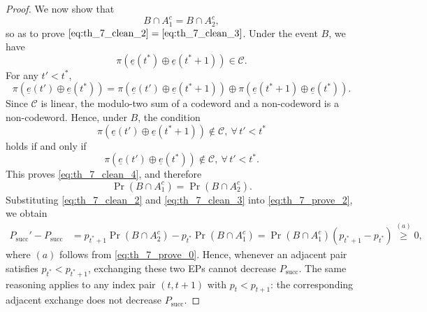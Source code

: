 \documentclass[letterpaper,draftclsnofoot,onecolumn]{IEEEtran}
\begin{document}
\begin{proof}
We now show that
\begin{equation}\label{eq:th_7_clean_4}
    B\cap A_1^c = B\cap A_2^c,
\end{equation}
so as to prove $\eqref{eq:th_7_clean_2} = \eqref{eq:th_7_clean_3}$. Under the event $B$, we have
\begin{equation}
\pi(\underline{e}(t^{*})\oplus \underline{e}(t^{*}+1))\in\mathcal{C}.
\end{equation}
For any $t'<t^{*}$,
\begin{equation}
\pi(\underline{e}(t')\oplus \underline{e}(t^{*}))
= \pi(\underline{e}(t')\oplus \underline{e}(t^{*}+1)) \oplus \pi(\underline{e}(t^{*}+1)\oplus \underline{e}(t^{*})).
\end{equation}
Since $\mathcal{C}$ is linear, the modulo-two sum of a codeword and a non-codeword is a non-codeword. Hence, under $B$, the condition
\begin{equation}
\pi(\underline{e}(t')\oplus \underline{e}(t^{*}+1))\notin\mathcal{C},\ \forall\, t'<t^{*}
\end{equation}
holds if and only if
\begin{equation}
\pi(\underline{e}(t')\oplus \underline{e}(t^{*}))\notin\mathcal{C},\ \forall\, t'<t^{*}.
\end{equation}
This proves \eqref{eq:th_7_clean_4}, and therefore
\begin{equation}
    \Pr(B\cap A_1^c)=\Pr(B\cap A_2^c).
\end{equation}
Substituting \eqref{eq:th_7_clean_2} and \eqref{eq:th_7_clean_3} into \eqref{eq:th_7_prove_2}, we obtain
\begin{align}
    P_{\mathrm{succ}}'-P_{\mathrm{succ}}
    &= p_{t^{*}+1}\Pr(B\cap A_2^c)-p_{t^{*}}\Pr(B\cap A_1^c) = \Pr(B\cap A_1^c)\left(p_{t^{*}+1}-p_{t^{*}}\right)\overset{(a)}{\geq}0,\label{eq:th_7_succ_diff_nonneg}
\end{align}
where $(a)$ follows from \eqref{eq:th_7_prove_0}. Hence, whenever an adjacent pair satisfies $p_{t^{*}}<p_{t^{*}+1}$, exchanging these two EPs cannot decrease $P_{\mathrm{succ}}$. The same reasoning applies to any index pair $(t,t+1)$ with $p_t<p_{t+1}$: the corresponding adjacent exchange does not decrease $P_{\mathrm{succ}}$.


\end{proof}
\end{document}
